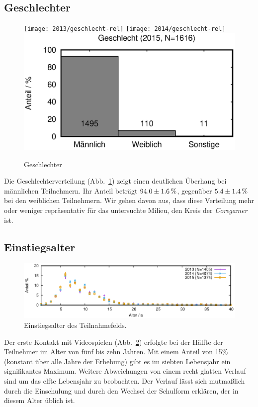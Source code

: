 \documentclass[11pt]{scrartcl}
\begin{document}
\subsection{Geschlechter}

\begin{figure}[htb]
	\centering
	\texttt{[image: 2013/geschlecht-rel]}\hfill
	\texttt{[image: 2014/geschlecht-rel]}\hfill
	\includegraphics[width=0.33\linewidth]{2015/geschlecht-rel}
	\caption{Geschlechter}
	\label{fig: geschlecht}
\end{figure}

Die Geschlechterverteilung (Abb.~\ref{fig: geschlecht})
zeigt einen deutlichen Überhang bei männlichen Teilnehmern.
Ihr Anteil beträgt \(\unit[94.0\pm1.6]{\%}\),
gegenüber \(\unit[5.4\pm1.4]{\%}\) bei den weiblichen Teilnehmern.
Wir gehen davon aus, dass diese Verteilung mehr oder weniger repräsentativ
für das untersuchte Milieu, den Kreis der \emph{Coregamer} ist.


\subsection{Einstiegsalter}

\begin{figure}[htb]
	\centering
	\includegraphics[width=15cm]{vgl/einstiegsalter}
	\caption[Einstiegsalter]
	{Einstiegsalter des Teilnahmefelds.}
	\label{fig: einstiegsalter}
\end{figure}

Der erste Kontakt mit Videospielen (Abb.~\ref{fig: einstiegsalter})
erfolgte bei der Hälfte der Teilnehmer im Alter von fünf bis zehn Jahren.
Mit einem Anteil von 15\% (konstant über alle Jahre der Erhebung)
gibt es im siebten Lebensjahr ein signifikantes Maximum.
Weitere Abweichungen von einem recht glatten Verlauf sind um das elfte
Lebensjahr zu beobachten.
Der Verlauf lässt sich mutmaßlich durch die Einschulung und durch den
Wechsel der Schulform erklären, der in diesem Alter üblich ist.
\end{document}

